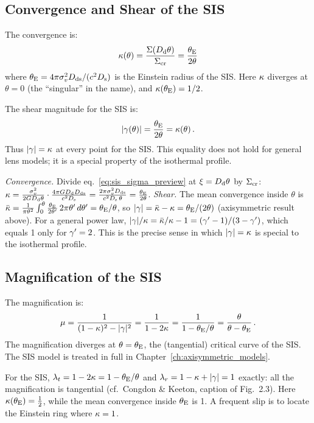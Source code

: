 \subsection{Convergence and Shear of the SIS}

The convergence is:
\begin{equation}
    \kappa(\theta) = \frac{\Sigma(D_{\mathrm{d}}\theta)}{\Sigma_{\mathrm{cr}}}
    = \frac{\theta_{\mathrm{E}}}{2\theta}
    \label{eq:kappa_sis}
\end{equation}
where $\theta_{\mathrm{E}} = 4\pi\sigma_v^2D_{\mathrm{ds}}/(c^2D_{\mathrm{s}})$ is the
Einstein radius of the SIS\@.  Here $\kappa$ diverges at
$\theta = 0$ (the ``singular'' in the name), and
$\kappa(\theta_{\mathrm{E}}) = 1/2$.

The shear magnitude for the SIS is:
\begin{equation}
    |\gamma(\theta)| = \frac{\theta_{\mathrm{E}}}{2\theta}
    = \kappa(\theta) \,.
    \label{eq:gamma_sis}
\end{equation}
Thus $|\gamma| = \kappa$ at every point for the SIS\@.  This
equality does not hold for general lens models; it is a
special property of the isothermal profile.
\begin{derivation}
\emph{Convergence.} Divide eq.~\eqref{eq:sis_sigma_preview} at $\xi = D_{\mathrm{d}}\theta$
by $\Sigma_{\mathrm{cr}}$:
$\kappa = \frac{\sigma_v^2}{2GD_{\mathrm{d}}\theta}\cdot\frac{4\pi GD_{\mathrm{d}}D_{\mathrm{ds}}}{c^2D_{\mathrm{s}}}
= \frac{2\pi\sigma_v^2D_{\mathrm{ds}}}{c^2D_{\mathrm{s}}\,\theta} = \frac{\theta_{\mathrm{E}}}{2\theta}$.
\emph{Shear.} The mean convergence inside $\theta$ is
$\bar{\kappa} = \frac{1}{\pi\theta^2}\int_0^\theta\frac{\theta_{\mathrm{E}}}{2\theta'}\,2\pi\theta'\,d\theta' = \theta_{\mathrm{E}}/\theta$,
so $|\gamma| = \bar{\kappa} - \kappa = \theta_{\mathrm{E}}/(2\theta)$ (axisymmetric
result above). For a general power law,
$|\gamma|/\kappa = \bar{\kappa}/\kappa - 1 = (\gamma' - 1)/(3 - \gamma')$, which equals 1 only
for $\gamma' = 2$. This is the precise sense in which $|\gamma| = \kappa$ is
special to the isothermal profile.
\end{derivation}

\subsection{Magnification of the SIS}

The magnification is:
\begin{equation}
    \mu = \frac{1}{(1 - \kappa)^2 - |\gamma|^2}
    = \frac{1}{1 - 2\kappa}
    = \frac{1}{1 - \theta_{\mathrm{E}}/\theta}
    = \frac{\theta}{\theta - \theta_{\mathrm{E}}} \,.
    \label{eq:mu_sis}
\end{equation}
The magnification diverges at $\theta = \theta_{\mathrm{E}}$, the
(tangential) critical curve of the SIS\@.  The SIS model is treated
in full in Chapter~\ref{ch:axisymmetric_models}.
\begin{annotation}
For the SIS, $\lambda_t = 1 - 2\kappa = 1 - \theta_{\mathrm{E}}/\theta$ and
$\lambda_r = 1 - \kappa + |\gamma| = 1$ exactly: all the magnification is
tangential (cf.\ Congdon \& Keeton, caption of Fig.~2.3). Here
$\kappa(\theta_{\mathrm{E}}) = \tfrac12$, while the mean convergence inside $\theta_{\mathrm{E}}$ is
1. A frequent slip is to locate the Einstein ring where $\kappa = 1$.
\end{annotation}


